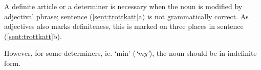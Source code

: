 \documentclass{report}
\begin{document}

A definite article or a determiner is necessary when the noun is modified by adjectival
phrase; sentence (\ref{sent:trottkatt}a) is not grammatically correct.
As adjectives also marks definiteness, this is marked on three places
in sentence (\ref{sent:trottkatt}b). %

\label{sent:trottkatt}
However, for some determiners, ie. `min' (\emph{`my'}), the noun should be in indefinite form.

\enumsentence{\longexnt{3}{3}
{min &trötta& katt} %
{`my & tired & cat'}
{ $[${\sc+def}$]$ &$[${\sc+def}$]$& $[${\sc-def}$]$} %
{}}

\end{document}
